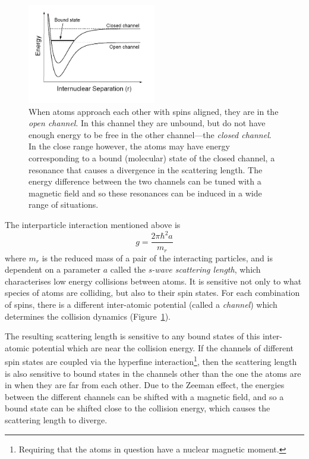 \begin{figure}%
\begin{center}
\includegraphics[width=0.5\textwidth]{figures/unsorted/feshbach.png}
\caption{When atoms approach each other with spins aligned, they are in the \emph{open channel}. In this channel they are unbound, but do not have enough energy to be free in the other channel---the \emph{closed channel}. In the close range however, the atoms may have energy corresponding to a bound (molecular) state of the closed channel, a resonance that causes a divergence in the scattering length. The energy difference between the two channels can be tuned with a magnetic field and so these resonances can be induced in a wide range of situations.}\label{fig:feshbach}
\end{center}
\end{figure}

The interparticle interaction mentioned above is
\begin{equation}
g = \frac{2\pi \hbar^2 a}{m_r}
\end{equation}
where $m_r$ is the reduced mass of a pair of the interacting particles, and is dependent on a parameter $a$ called the \emph{s-wave scattering length}, which characterises low energy collisions between atoms. It is sensitive not only to what species of atoms are colliding, but also to their spin states. For each combination of spins, there is a different inter-atomic potential (called a \emph{channel}) which determines the collision dynamics (Figure~\ref{fig:feshbach}).

The resulting scattering length is sensitive to any bound states of this inter-atomic potential which are near the collision energy. If the channels of different spin states are coupled via the hyperfine interaction\footnote{Requiring that the atoms in question have a nuclear magnetic moment.}, then the scattering length is also sensitive to bound states in the channels other than the one the atoms are in when they are far from each other. Due to the Zeeman effect, the energies between the different channels can be shifted with a magnetic field, and so a bound state can be shifted close to the collision energy, which causes the scattering length to diverge.

